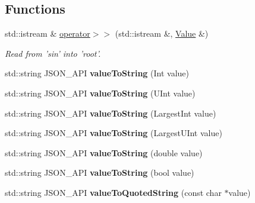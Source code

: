 \subsection*{Functions}
\begin{DoxyCompactItemize}
\item 
std\-::istream \& \hyperlink{namespace_json_a4d245ef719cc0853e8e78eb5f99c16e5}{operator$>$$>$} (std\-::istream \&, \hyperlink{class_json_1_1_value}{Value} \&)
\begin{DoxyCompactList}\small\item\em Read from 'sin' into 'root'. \end{DoxyCompactList}\item 
\hypertarget{namespace_json_a5d3eba6789f9a9c1ab563ff8b4a5090f}{std\-::string J\-S\-O\-N\-\_\-\-A\-P\-I {\bfseries value\-To\-String} (Int value)}\label{namespace_json_a5d3eba6789f9a9c1ab563ff8b4a5090f}

\item 
\hypertarget{namespace_json_a4d43b0ff222bd3975bcf1babca0b978f}{std\-::string J\-S\-O\-N\-\_\-\-A\-P\-I {\bfseries value\-To\-String} (U\-Int value)}\label{namespace_json_a4d43b0ff222bd3975bcf1babca0b978f}

\item 
\hypertarget{namespace_json_abd9c650f70d9434f98f9025e2e2faf2d}{std\-::string J\-S\-O\-N\-\_\-\-A\-P\-I {\bfseries value\-To\-String} (Largest\-Int value)}\label{namespace_json_abd9c650f70d9434f98f9025e2e2faf2d}

\item 
\hypertarget{namespace_json_a3f46b0bc62b95a9426a2da0117bdf9f0}{std\-::string J\-S\-O\-N\-\_\-\-A\-P\-I {\bfseries value\-To\-String} (Largest\-U\-Int value)}\label{namespace_json_a3f46b0bc62b95a9426a2da0117bdf9f0}

\item 
\hypertarget{namespace_json_a99995d7dafa4f4970b349d7d3c8d1d99}{std\-::string J\-S\-O\-N\-\_\-\-A\-P\-I {\bfseries value\-To\-String} (double value)}\label{namespace_json_a99995d7dafa4f4970b349d7d3c8d1d99}

\item 
\hypertarget{namespace_json_a979ed531f091985e22f0051cd2a8e341}{std\-::string J\-S\-O\-N\-\_\-\-A\-P\-I {\bfseries value\-To\-String} (bool value)}\label{namespace_json_a979ed531f091985e22f0051cd2a8e341}

\item 
\hypertarget{namespace_json_aa0c8235a4a5c6599da5d3332743db8ac}{std\-::string J\-S\-O\-N\-\_\-\-A\-P\-I {\bfseries value\-To\-Quoted\-String} (const char $\ast$value)}\label{namespace_json_aa0c8235a4a5c6599da5d3332743db8ac}


\end{DoxyCompactItemize}
